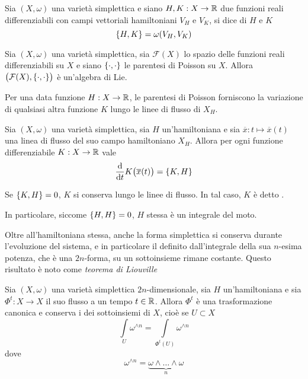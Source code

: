 \begin{definition}
  Sia $(X, \omega)$ una varietà simplettica e siano $H,K: X \to \mathbb{R}$ due funzioni reali differenziabili con campi vettoriali hamiltoniani $V_H$ e $V_K$, si dice  di $H$ e $K$ \begin{equation*}
  \pb{H}{K} = \omega(V_H,V_K) 
  \end{equation*} 
\end{definition}
\begin{theorem}
  Sia $(X, \omega)$ una varietà simplettica, sia $\mathcal{F}(X)$ lo spazio delle funzioni reali differenziabili su $X$ e siano $\pb{\cdot}{\cdot}$ le parentesi di Poisson su $X$. Allora $\big(\mathcal{F}(X), \pb{\cdot}{\cdot}\big)$ è un'algebra di Lie.
\end{theorem}

Per una data funzione $H:X\to \mathbb{R}$, le parentesi di Poisson forniscono la variazione di qualsiasi altra funzione $K$ lungo le linee di flusso di $X_H$.
\begin{theorem}
  Sia $(X, \omega)$ una varietà simplettica, sia $H$ un'hamiltoniana e sia $\overline{x}:t \mapsto \overline{x}(t)$ una linea di flusso del suo campo hamiltoniano $X_H$. Allora per ogni funzione differenziabile $K:X\to \mathbb{R}$ vale \begin{equation*}
  \dv{t} K\big(\overline{x}(t)\big) = \pb{K}{H}
  \end{equation*}  
\end{theorem}
\begin{corollary}
  Se $\pb{K}{H} = 0$, $K$ si conserva lungo le linee di flusso. In tal caso, $K$ è detto .
\end{corollary}
\begin{corollary}
  In particolare, siccome $\pb{H}{H} = 0$, $H$ stessa è un integrale del moto.
\end{corollary}

Oltre all'hamiltoniana stessa, anche la forma simplettica si conserva durante l'evoluzione del sistema, e in particolare il  definito dall'integrale della sua $n$-esima potenza, che è una $2n$-forma, su un sottoinsieme rimane costante. Questo risultato è noto come \emph{teorema di Liouville}
\begin{theorem}[Liouville]
  Sia $(X, \omega)$ una varietà simplettica $2n$-dimensionale, sia $H$ un'hamiltoniana e sia $\Phi^t:X \to X$ il suo flusso a un tempo $t \in \mathbb{R}$. Allora $\Phi^t$ è una trasformazione canonica e conserva i  dei sottoinsiemi di $X$, cioè se $U \subset X$
  \begin{equation*}
  \int\limits_U \omega^{\wedge n} = \int\limits_{\Phi^t(U)} \omega^{\wedge n}
  \end{equation*} 
  dove 
  \begin{equation*}
    \omega^{\wedge n} = \underbrace{\omega \wedge \ldots \wedge \omega}_{n}
  \end{equation*} 
\end{theorem}

